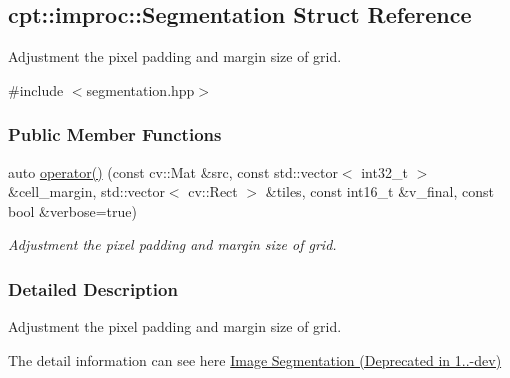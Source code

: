 \hypertarget{structcpt_1_1improc_1_1_segmentation}{\subsection{cpt\-:\-:improc\-:\-:Segmentation Struct Reference}
\label{structcpt_1_1improc_1_1_segmentation}
}


Adjustment the pixel padding and margin size of grid.  




{\ttfamily \#include $<$segmentation.\-hpp$>$}

\subsubsection*{Public Member Functions}
\begin{DoxyCompactItemize}
\item 
auto \hyperlink{structcpt_1_1improc_1_1_segmentation_a86e082651b7401c6fa0a5de2bef96a91}{operator()} (const cv\-::\-Mat \&src, const std\-::vector$<$ int32\-\_\-t $>$ \&cell\-\_\-margin, std\-::vector$<$ cv\-::\-Rect $>$ \&tiles, const int16\-\_\-t \&v\-\_\-final, const bool \&verbose=true)
\begin{DoxyCompactList}\small\item\em Adjustment the pixel padding and margin size of grid. \end{DoxyCompactList}\end{DoxyCompactItemize}


\subsubsection{Detailed Description}
Adjustment the pixel padding and margin size of grid. 

The detail information can see here \hyperlink{improc_segmentation}{Image Segmentation (Deprecated in 1..-\/dev)} 

